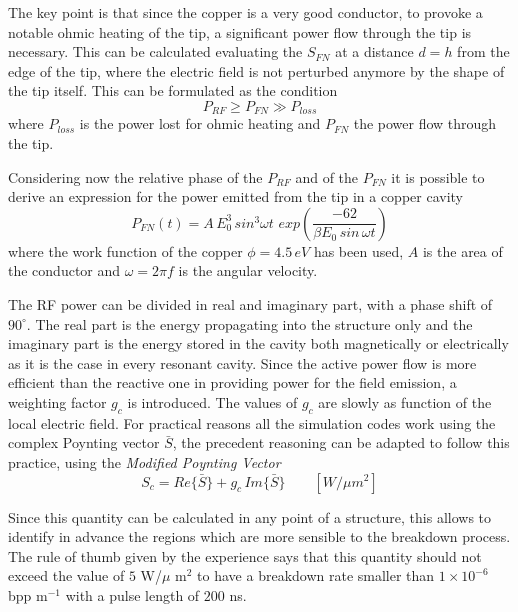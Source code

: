 The key point is that since the copper is a very good conductor, to provoke a notable ohmic heating of the tip, a significant power flow through the tip is necessary. This can be calculated evaluating the $S_{FN}$ at a distance $d=h$ from the edge of the tip, where the electric field is not perturbed anymore by the shape of the tip itself. This can be formulated as the condition 
\begin{equation}
P_{RF} \ge P_{FN} \gg P_{loss}
\end{equation}
where $P_{loss}$ is the power lost for ohmic heating and $P_{FN}$ the power flow through the tip.

Considering now the relative phase of the $P_{RF}$ and of the $P_{FN}$ it is possible to derive an expression for the power emitted from the tip in a copper cavity
\begin{equation}
P_{FN} (t) = A \, E^3_0 \, sin^3 \omega t \,  \, exp \left ( \frac{-62}{\beta E_0 \, sin \, \omega t} \right )
\end{equation}
where the work function of the copper $\phi = 4.5 \, eV$ has been used, $A$ is the area of the conductor and $\omega = 2 \pi f$ is the angular velocity.

The RF power can be divided in real and imaginary part, with a phase shift of $90^\circ$. The real part is the energy propagating into the structure only and the imaginary part is the energy stored in the cavity both magnetically or electrically as it is the case in every resonant cavity. Since the active power flow is more efficient than the reactive one in providing power for the field emission, a weighting factor $g_c$ is introduced. The values of $g_c$ are slowly as function of the local electric field. For practical reasons all the simulation codes work using the complex Poynting vector $\bar{S}$, the precedent reasoning can be adapted to follow this practice, using the \textit{Modified Poynting Vector}
\begin{equation}
S_c = Re\{ \bar{S} \} + g_c \, Im \{ \bar{S} \} \qquad [W/\mu m^2]
\end{equation} 

Since this quantity can be calculated in any point of a structure, this allows to identify in advance the regions which are more sensible to the breakdown process. The rule of thumb given by the experience says that this quantity should not exceed the value of $5$ W/$\mu$ m$^2$ to have a breakdown rate smaller than $1\times 10^{-6} $ bpp  m$^{-1}$ with a pulse length of $200$ ns.

